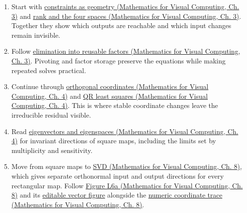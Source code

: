 \begin{enumerate}
\def\labelenumi{\arabic{enumi}.}
\tightlist
\item
  Start with \href{../02-Mathematics-for-Visual-Computing/main.pdf\#nameddest=01-foundations-i-ch019-a-system-is-an-intersection-of-constraints}{constraints as geometry (Mathematics for Visual Computing, Ch. 3)} and \href{../02-Mathematics-for-Visual-Computing/main.pdf\#nameddest=01-foundations-i-ch019-rank-the-four-spaces-and-the-shape-of-the-answer}{rank and the four spaces (Mathematics for Visual Computing, Ch. 3)}. Together they show which outputs are reachable and which input changes remain invisible.
\item
  Follow \href{../02-Mathematics-for-Visual-Computing/main.pdf\#nameddest=01-foundations-i-ch019-elimination-multipliers-become-stored-factor-data}{elimination into reusable factors (Mathematics for Visual Computing, Ch. 3)}. Pivoting and factor storage preserve the equations while making repeated solves practical.
\item
  Continue through \href{../02-Mathematics-for-Visual-Computing/main.pdf\#nameddest=01-foundations-i-ch020-orthogonal-coordinates-preserve-the-shape-of-the-problem}{orthogonal coordinates (Mathematics for Visual Computing, Ch. 4)} and \href{../02-Mathematics-for-Visual-Computing/main.pdf\#nameddest=01-foundations-i-ch020-qr-turns-least-squares-into-a-triangular-solve-plus-an-irreducible-residual}{QR least squares (Mathematics for Visual Computing, Ch. 4)}. This is where stable coordinate changes leave the irreducible residual visible.
\item
  Read \href{../02-Mathematics-for-Visual-Computing/main.pdf\#nameddest=01-foundations-i-ch020-eigenvalues-eigenspaces-and-the-two-kinds-of-multiplicity}{eigenvectors and eigenspaces (Mathematics for Visual Computing, Ch. 4)} for invariant directions of square maps, including the limits set by multiplicity and sensitivity.
\item
  Move from square maps to \href{../02-Mathematics-for-Visual-Computing/main.pdf\#nameddest=02-foundations-ii-ch024-the-svd-equation-as-independent-input-output-channels}{SVD (Mathematics for Visual Computing, Ch. 8)}, which gives separate orthonormal input and output directions for every rectangular map. Follow \href{../02-Mathematics-for-Visual-Computing/main.pdf\#nameddest=02-foundations-ii-ch024-figure-l6a---watch-the-same-directions-become-an-ellipse}{Figure L6a (Mathematics for Visual Computing, Ch. 8)} and its \href{../current/Assets/Print/3491f9bdb1d7f300619c0d11a33ded7f3b3adfdc803929f353124f6903c784b4.svg}{editable vector figure} alongside the \href{../02-Mathematics-for-Visual-Computing/main.pdf\#nameddest=02-foundations-ii-ch024-a-concrete-rotation-stretch-and-coordinate-trace}{numeric coordinate trace (Mathematics for Visual Computing, Ch. 8)}.

\end{enumerate}
